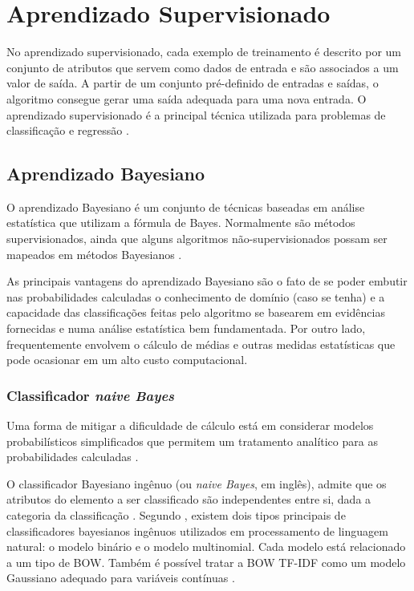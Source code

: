 \section{Aprendizado Supervisionado}

No aprendizado supervisionado, cada exemplo de treinamento é descrito por um conjunto de atributos que servem como dados de entrada e são associados a um valor de saída. A partir de um conjunto pré-definido de entradas e saídas, o algoritmo consegue gerar uma saída adequada para uma nova entrada. O aprendizado supervisionado é a principal técnica utilizada para problemas de classificação e regressão \cite{mohri2012}.

\subsection{Aprendizado Bayesiano}

O aprendizado Bayesiano é um conjunto de técnicas baseadas em análise estatística que utilizam a fórmula de Bayes. Normalmente são métodos supervisionados, ainda que alguns algoritmos não-supervisionados possam ser mapeados em métodos Bayesianos \cite{mitchell1997}.

As principais vantagens do aprendizado Bayesiano são o fato de se poder embutir nas probabilidades calculadas o conhecimento de domínio (caso se tenha) e a capacidade das classificações feitas pelo algoritmo se basearem em evidências fornecidas e numa análise estatística bem fundamentada. Por outro lado, frequentemente envolvem o cálculo de médias e outras medidas estatísticas que pode ocasionar em um alto custo computacional.

\subsubsection{Classificador \textit{naive Bayes}}

Uma forma de mitigar a dificuldade de cálculo está em considerar modelos probabilísticos simplificados que permitem um tratamento analítico para as probabilidades calculadas \cite{pardo2002}.

O classificador Bayesiano ingênuo (ou \textit{naive Bayes}, em inglês), admite que os atributos do elemento a ser classificado são independentes entre si, dada a categoria da classificação \cite{pellucci2011}. Segundo , existem dois tipos principais de classificadores bayesianos ingênuos utilizados em processamento de linguagem natural: o modelo binário e o modelo multinomial. Cada modelo está relacionado a um tipo de BOW. Também é possível tratar a BOW TF-IDF como um modelo Gaussiano adequado para variáveis contínuas \cite{hand2001}.

